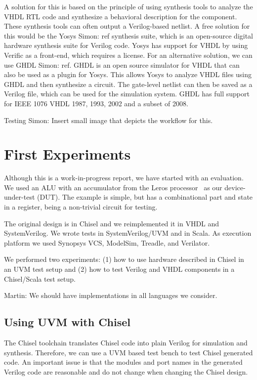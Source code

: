 \documentclass[conference]{IEEEtran}
\newcommand{\martin}[1]{{\color{blue} Martin: #1}}
\newcommand{\simon}[1]{{\color{green} Simon: #1}}
\begin{document}
A solution for this is based on the principle of using synthesis tools to analyze the VHDL RTL code
and synthesize a behavioral description for the component.
These synthesis tools can often output a Verilog-based netlist.
A free solution for this would be the Yosys \simon{ref} synthesis suite, which is an open-source
digital hardware synthesis suite for Verilog code.
Yosys has support for VHDL by using Verific as a front-end, which requires a license.
For an alternative solution, we can use GHDL \simon{ref}.
GHDL is an open source simulator for VHDL that can also be used as a plugin for Yosys.
This allows Yosys to analyze VHDL files using GHDL and then synthesize a circuit.
The gate-level netlist can then be saved as a Verilog file, which can be used for the simulation system.
GHDL has full support for IEEE 1076 VHDL 1987, 1993, 2002 and a subset of 2008.

Testing
\simon{Insert small image that depicts the workflow for this.}

\section{First Experiments}

Although this is a work-in-progress report, we have started with an evaluation.
We used an ALU with an accumulator from the Leros processor~\cite{leros:arcs2019}
as our device-under-test (DUT).
The example is simple, but has a combinational part and state in a register, being
a non-trivial circuit for testing.

The original design is in Chisel and we reimplemented it in VHDL and SystemVerilog.
We wrote tests in SystemVerilog/UVM and in Scala.
As execution platform we used Synopsys VCS, ModelSim, Treadle, and Verilator.

We performed two experiments: (1) how to use hardware described in Chisel in an
UVM test setup and (2) how to test Verilog and VHDL components in a Chisel/Scala
test setup.

\martin{We should have implementations in all languages we consider.}


\subsection{Using UVM with Chisel}

The Chisel toolchain translates Chisel code into plain Verilog for simulation and synthesis. Therefore, we can use a UVM based test bench to test Chisel generated code.
An important issue is that the modules and port names in the generated Verilog code are reasonable and do not change when changing the Chisel design.
\end{document}
